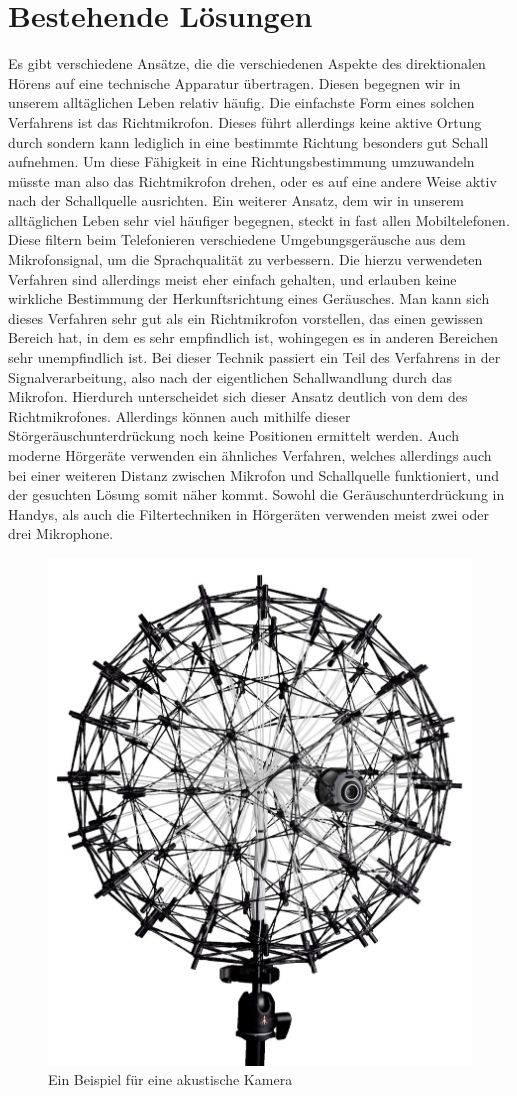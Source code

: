 \section{Bestehende Lösungen} 
  Es gibt verschiedene Ansätze, die die verschiedenen Aspekte des direktionalen Hörens auf eine technische Apparatur übertragen. Diesen begegnen wir in unserem alltäglichen Leben relativ häufig. Die einfachste Form eines solchen Verfahrens ist das Richtmikrofon. Dieses führt allerdings keine aktive Ortung durch sondern kann lediglich in eine bestimmte Richtung besonders gut Schall aufnehmen. Um diese Fähigkeit in eine Richtungsbestimmung umzuwandeln müsste man also das Richtmikrofon drehen, oder es auf eine andere Weise aktiv nach der Schallquelle ausrichten. Ein weiterer Ansatz, dem wir in unserem alltäglichen Leben sehr viel häufiger begegnen, steckt in fast allen Mobiltelefonen. Diese filtern beim Telefonieren verschiedene Umgebungsgeräusche aus dem Mikrofonsignal, um die Sprachqualität zu verbessern. Die hierzu verwendeten Verfahren sind allerdings meist eher einfach gehalten, und erlauben keine wirkliche Bestimmung der Herkunftsrichtung eines Geräusches. Man kann sich dieses Verfahren sehr gut als ein Richtmikrofon vorstellen, das einen gewissen Bereich hat, in dem es sehr empfindlich ist, wohingegen es in anderen Bereichen sehr unempfindlich ist. Bei dieser Technik passiert ein Teil des Verfahrens in der Signalverarbeitung, also nach der eigentlichen Schallwandlung durch das Mikrofon. Hierdurch unterscheidet sich dieser Ansatz deutlich von dem des Richtmikrofones. Allerdings können auch mithilfe dieser Störgeräuschunterdrückung noch keine Positionen ermittelt werden. Auch moderne Hörgeräte verwenden ein ähnliches Verfahren, welches allerdings auch bei einer weiteren Distanz zwischen Mikrofon und Schallquelle funktioniert, und der gesuchten Lösung somit näher kommt. Sowohl die Geräuschunterdrückung in Handys, als auch die Filtertechniken in Hörgeräten verwenden meist zwei oder drei Mikrophone.
  \begin{figure}
    \centering
    \includegraphics[width=0.35\linewidth]{img/akusticCamera}
    \caption{Ein Beispiel für eine akustische Kamera \cite{camera}}
    \label{fig:camera}
  \end{figure}
